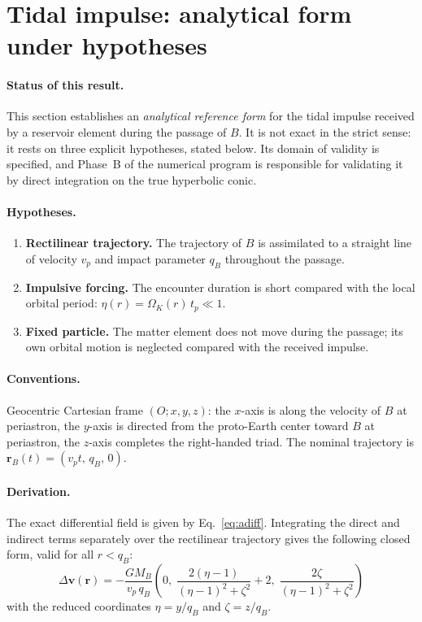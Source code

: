 \documentclass[11pt,a4paper,openany]{report}
\begin{document}
\section{Tidal impulse: analytical form under hypotheses}
\label{app:impulsion}

\paragraph{Status of this result.}
This section establishes an \emph{analytical reference form} for the tidal impulse received by a
reservoir element during the passage of $B$. It is not exact in the strict sense: it rests on three
explicit hypotheses, stated below. Its domain of validity is specified, and Phase~B of the
numerical program is responsible for validating it by direct integration on the true hyperbolic
conic.

\paragraph{Hypotheses.}
\begin{enumerate}
\item \textbf{Rectilinear trajectory.} The trajectory of $B$ is assimilated to a straight line of
velocity $v_p$ and impact parameter $q_B$ throughout the passage.
\item \textbf{Impulsive forcing.} The encounter duration is short compared with the local orbital
period: $\eta(r)=\Omega_K(r)\,t_{p}\ll1$.
\item \textbf{Fixed particle.} The matter element does not move during the passage; its own orbital
motion is neglected compared with the received impulse.
\end{enumerate}

\paragraph{Conventions.}
Geocentric Cartesian frame $(O;x,y,z)$: the $x$-axis is along the velocity of $B$ at periastron,
the $y$-axis is directed from the proto-Earth center toward $B$ at periastron, the $z$-axis
completes the right-handed triad. The nominal trajectory is
$\mathbf{r}_B(t)=(v_p t,\,q_B,\,0)$.

\paragraph{Derivation.}
The exact differential field is given by Eq.~\eqref{eq:adiff}. Integrating the direct and indirect
terms separately over the rectilinear trajectory gives the following closed form, valid for all
$r<q_B$:
\begin{equation}
\boxed{\;
\Delta\mathbf{v}(\mathbf{r})
=
-\frac{GM_B}{v_p\,q_B}
\left(
0,\;
\frac{2(\eta-1)}{(\eta-1)^2+\zeta^2}+2,\;
\frac{2\zeta}{(\eta-1)^2+\zeta^2}
\right)
\;}
\label{eq:impulsion-close}
\end{equation}
with the reduced coordinates $\eta=y/q_B$ and $\zeta=z/q_B$.
\end{document}
